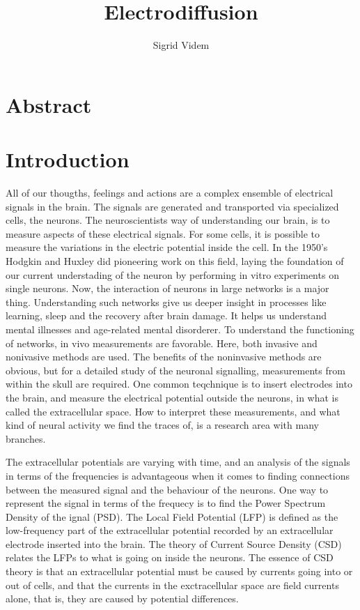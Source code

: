 \documentclass{article}
\author{Sigrid Videm}
\title{Electrodiffusion}
\begin{document}
\maketitle


\section{Abstract} 
\tableofcontents %


\section{Introduction}
All of our thougths, feelings and actions are a complex ensemble of electrical signals in the brain. The signals are generated and transported via specialized cells, the neurons. The neuroscientists way of understanding our brain, is to measure aspects of these electrical signals. For some cells, it is possible to measure the variations in the electric potential inside the cell. In the 1950's Hodgkin and Huxley did pioneering work on this field, laying the foundation of our current understading of the neuron by performing in vitro experiments on single neurons. Now, the interaction of neurons in large networks is a major thing. Understanding such networks give us deeper insight in processes like learning, sleep and the recovery after brain damage. It helps us understand mental illnesses and age-related mental disorderer. To understand the functioning of networks, in vivo measurements are favorable. Here, both invasive and nonivasive methods are used. The benefits of the noninvasive methods are obvious, but for a detailed study of the neuronal signalling, measurements from within the skull are required.  One common teqchnique is to insert electrodes into the brain, and measure the electrical potential outside the neurons, in what is called the extracellular space. How to interpret these measurements, and what kind of neural activity we find the traces of, is a research area with many branches. 

The extracellular potentials are varying with time, and an analysis of the signals in terms of the frequencies is advantageous when it comes to finding connections between the measured signal and the behaviour of the neurons. One way to represent the signal in terms of the frequecy is to find the Power Spectrum Density of the ignal (PSD).  The Local Field Potential (LFP) is defined as the low-frequency part of the extracellular potential recorded by an extracellular electrode inserted into the brain. The theory of Current Source Density (CSD) relates the LFPs to what is going on inside the neurons. The essence of CSD theory is that an extracellular potential must be caused by currents going into or out of cells, and that the currents in the exctracellular space are field currents alone, that is, they are caused by potential differences. 
\end{document}
